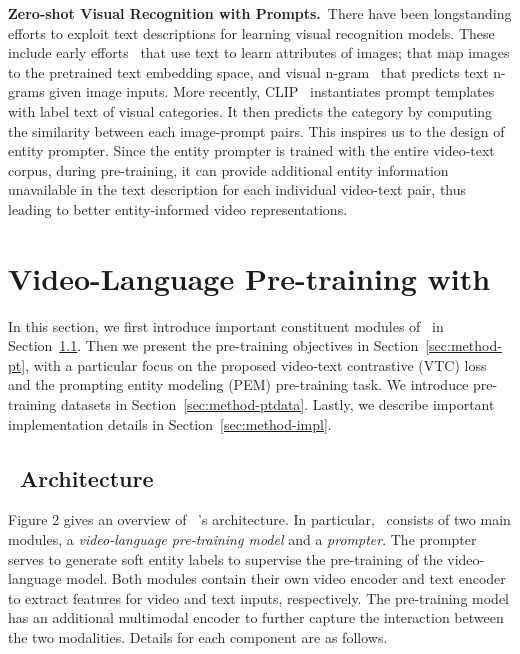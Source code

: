 \documentclass[10pt,twocolumn,letterpaper]{article}
\begin{document}
\noindent\textbf{Zero-shot Visual Recognition with Prompts.}~There have been longstanding efforts to exploit text descriptions for learning visual recognition models.
These include early efforts~\cite{barnard2001clustering,lampert2009learning,farhadi2009describing} that use text to learn attributes of images;  \cite{palatucci2009zero,socher2013zero,norouzi2014zero} that map images to the pretrained text embedding space, and visual n-gram~\cite{li2017learning} that predicts text n-grams given image inputs.
More recently, CLIP~\cite{radford2learning} instantiates prompt templates with label text of visual categories.
It then predicts the category by computing the similarity between each image-prompt pairs.
This inspires us to the design of entity prompter.
Since the entity prompter is trained with the entire video-text corpus, during pre-training, it can provide additional entity information unavailable in the text description for each individual video-text pair,
thus leading to better entity-informed video representations. \vspace{-0.5ex}
\section{Video-Language Pre-training with \name}
\vspace{-0.5ex}

In this section, we first introduce important constituent modules of \name~in Section~\ref{sec:method-arch}.
Then we present the pre-training objectives in Section~\ref{sec:method-pt}, with a particular focus on the proposed video-text contrastive (VTC) loss and the prompting entity modeling (PEM)
pre-training task.
We introduce pre-training datasets in Section~\ref{sec:method-ptdata}.
Lastly, we describe important implementation details in Section~\ref{sec:method-impl}.

\subsection{\textbf{\name}~Architecture}\label{sec:method-arch}
Figure 2 gives an overview of \name~'s architecture.
In particular, \name~consists of two main modules, a 
\emph{video-language pre-training model} and a \emph{prompter}.
The prompter serves to generate soft entity labels to supervise the pre-training of the video-language model.
Both modules contain their own video encoder and text encoder to extract features for video and text inputs, respectively.
The pre-training model has an additional multimodal encoder to further capture the interaction between the two modalities.
Details for each component are as follows.
\end{document}
